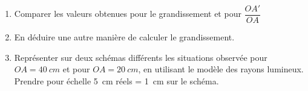 \documentclass[a4paper,11pt,fleqn]{article}%
\begin{document}
\begin{enumerate}[resume]
    \item Comparer les valeurs obtenues pour le grandissement et pour $\dfrac{OA'}{OA}$
    \item En déduire une autre manière de calculer le grandissement.
    \item Représenter sur deux schémas différents les situations observée pour $OA = \SI{40}{cm}$ et pour $OA = \SI{20}{cm}$, en utilisant le modèle des rayons lumineux. Prendre pour échelle \SI{5}{cm} réels = \SI{1}{cm} sur le schéma.
\end{enumerate}
\end{document}
